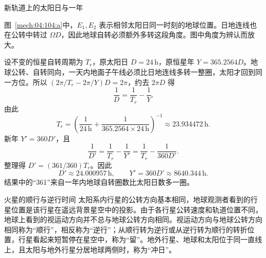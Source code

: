 {\begin{origexamplebox}{新轨道上的太阳日与一年}
\begin{qualityfigure}
\label{mech:04:104:q}
\end{qualityfigure}
\end{origexamplebox}
\begin{xesolution}
\begin{qualityfigure}
\label{mech:04:104:a}
\end{qualityfigure}
图~\ref{mech:04:104:a}中，$E_1,E_2$ 表示相邻太阳日同一时刻的地球位置。日地连线也在公转中转过 $\Omega D$，因此地球自转必须额外多转这段角度。图中角度为辨认而放大。

设不变的恒星自转周期为 $T_r$，原太阳日 $D=24\,\mathrm h$，原恒星年 $Y=365.2564D$。地球公转、自转同向，一天内地面子午线必须比日地连线多转一整圈，太阳才回到同一方位。所以 $(2\pi/T_r-2\pi/Y)D=2\pi$，约去 $2\pi D$ 得
\[
\frac1D=\frac1{T_r}-\frac1Y.
\]
由此
\[
T_r=\left(\frac1{24\,\mathrm h}+\frac1{365.2564\times24\,\mathrm h}\right)^{-1}
\approx23.934472\,\mathrm h.
\]
新年 $Y'=360D'$，且
\[
\frac1{D'}=\frac1{T_r}-\frac1{Y'}
=\frac1{T_r}-\frac1{360D'}.
\]
整理得 $D'=(361/360)T_r$。因此
\[
\boxed{D'\approx24.000957\,\mathrm h},
\qquad
\boxed{Y'=360D'\approx8640.344\,\mathrm h}.
\]
结果中的“361”来自一年内地球自转圈数比太阳日数多一圈。
\end{xesolution}


\begin{origexamplebox}{火星的顺行与逆行时间}\label{ch04:ex:k11-2-105}
太阳系内行星的公转方向基本相同，地球观测者看到的行星位置是该行星在遥远背景星空中的投影。由于各行星公转速度和轨道位置不同，地球上看到的视运动方向并不总与地球公转方向相同。视运动方向与地球公转方向相同称为“顺行”，相反称为“逆行”；从顺行转为逆行或从逆行转为顺行的转折位置，行星看起来短暂停在星空中，称为“留”。地外行星、地球和太阳位于同一直线上，且太阳与地外行星分居地球两侧时，称为“冲日”。


\end{origexamplebox}}
